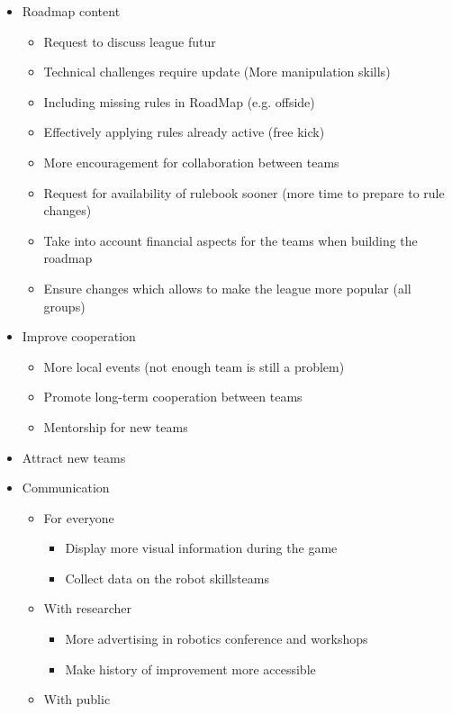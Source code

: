 \documentclass{article}
\begin{document}
\begin{itemize} 
   \item Roadmap content
   \begin{itemize} 
       \item Request to discuss league futur
       \item Technical challenges require update (More manipulation skills)
       \item Including missing rules in RoadMap (e.g. offside)
       \item Effectively applying rules already active (free kick)
       \item More encouragement for collaboration between teams
       \item Request for availability of rulebook sooner (more time to prepare to rule changes)
       \item Take into account financial aspects for the teams when building the roadmap
       \item Ensure changes which allows to make the league more popular (all groups)
\end{itemize}
   \item Improve cooperation
   \begin{itemize} 
       \item More local events (not enough team is still a problem)
       \item Promote long-term cooperation between teams
       \item Mentorship for new teams
\end{itemize}
   \item Attract new teams
   \item Communication
   \begin{itemize} 
       \item For everyone
       \begin{itemize} 
           \item Display more visual information during the game
           \item Collect data on the robot skillsteams 
   \end{itemize}
       \item With researcher
       \begin{itemize} 
           \item More advertising in robotics conference and workshops
           \item Make history of improvement more accessible
   \end{itemize}
       \item With public

\end{itemize}
\end{itemize}
\end{document}
